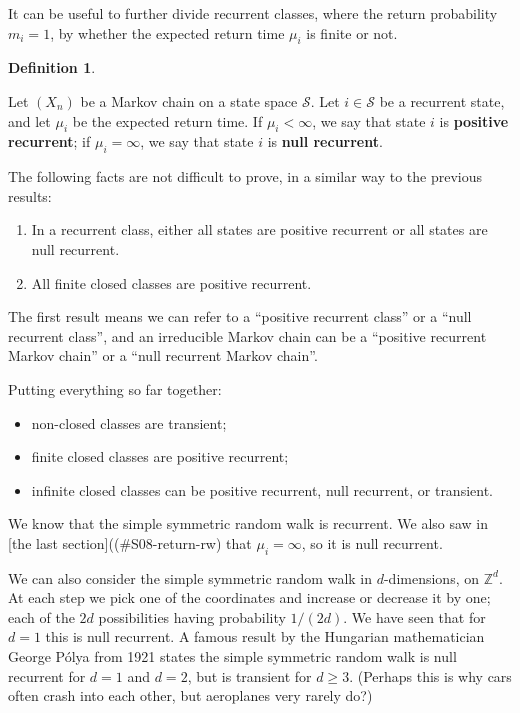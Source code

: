 \documentclass[
  a4paper,
]{article}
\providecommand{\tightlist}{%
  \setlength{\itemsep}{0pt}\setlength{\parskip}{0pt}}
\theoremstyle{definition}
\newtheorem{definition}{Definition}[section]
\theoremstyle{definition}
\theoremstyle{definition}
\theoremstyle{remark}
\begin{document}
It can be useful to further divide recurrent classes, where the return probability \(m_i = 1\), by whether the expected return time \(\mu_i\) is finite or not.

\begin{definition}
\protect\hypertarget{def:unlabeled-div-9}{}\label{def:unlabeled-div-9}

Let \((X_n)\) be a Markov chain on a state space \(\mathcal S\). Let \(i \in \mathcal S\) be a recurrent state, and let \(\mu_i\) be the expected return time.
If \(\mu_i < \infty\), we say that state \(i\) is \textbf{positive recurrent}; if \(\mu_i = \infty\), we say that state \(i\) is \textbf{null recurrent}.

\end{definition}

The following facts are not difficult to prove, in a similar way to the previous results:

\begin{enumerate}
\def\labelenumi{\arabic{enumi}.}
\tightlist
\item
  In a recurrent class, either all states are positive recurrent or all states are null recurrent.
\item
  All finite closed classes are positive recurrent.
\end{enumerate}

The first result means we can refer to a ``positive recurrent class'' or a ``null recurrent class'', and an irreducible Markov chain can be a ``positive recurrent Markov chain'' or a ``null recurrent Markov chain''.

Putting everything so far together:

\begin{itemize}
\tightlist
\item
  non-closed classes are transient;
\item
  finite closed classes are positive recurrent;
\item
  infinite closed classes can be positive recurrent, null recurrent, or transient.
\end{itemize}

We know that the simple symmetric random walk is recurrent. We also saw in {[}the last section{]}((\#S08-return-rw) that \(\mu_i = \infty\), so it is null recurrent.

We can also consider the simple symmetric random walk in \(d\)-dimensions, on \(\mathbb Z^d\). At each step we pick one of the coordinates and increase or decrease it by one; each of the \(2d\) possibilities having probability \(1/(2d)\). We have seen that for \(d=1\) this is null recurrent. A famous result by the Hungarian mathematician George Pólya from 1921 states the simple symmetric random walk is null recurrent for \(d = 1\) and \(d = 2\), but is transient for \(d \geq 3\). (Perhaps this is why cars often crash into each other, but aeroplanes very rarely do?)
\end{document}
